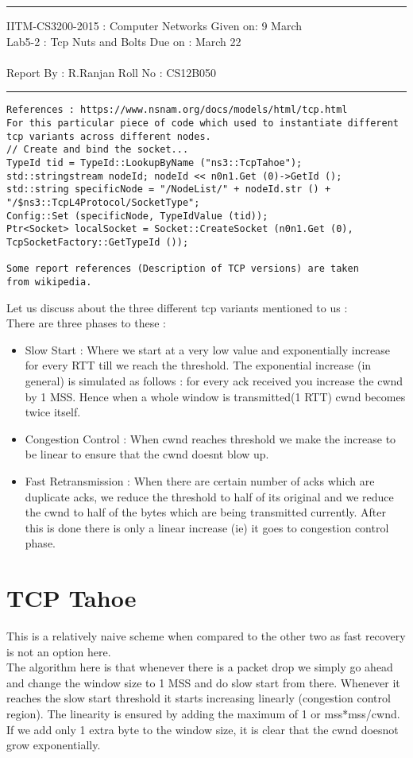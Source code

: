 \documentclass[solution,addpoints,12pt]{exam}
\begin{document}
\hrule
\vspace{3mm}
\noindent
{\sf IITM-CS3200-2015 : Computer Networks  \hfill Given on: 9 March}
\vspace{3mm} \\
\noindent
{\sf Lab5-2 : Tcp Nuts and Bolts \hfill Due on : March 22}\\\\
\vspace{3mm}
\noindent
{\sf Report By : R.Ranjan \hfill Roll No : CS12B050}
\vspace{3mm}
\hrule
\begin{verbatim}
References : https://www.nsnam.org/docs/models/html/tcp.html
For this particular piece of code which used to instantiate different
tcp variants across different nodes.
// Create and bind the socket...
TypeId tid = TypeId::LookupByName ("ns3::TcpTahoe");
std::stringstream nodeId; nodeId << n0n1.Get (0)->GetId ();
std::string specificNode = "/NodeList/" + nodeId.str () + "/$ns3::TcpL4Protocol/SocketType";
Config::Set (specificNode, TypeIdValue (tid));
Ptr<Socket> localSocket = Socket::CreateSocket (n0n1.Get (0), TcpSocketFactory::GetTypeId ());

Some report references (Description of TCP versions) are taken
from wikipedia.
\end{verbatim}


Let us discuss about the three different tcp variants
mentioned to us :\\
There are three phases to these :
\begin{itemize}
\item
Slow Start : Where we start at a very low value and
exponentially increase for every RTT till we reach the threshold.
The exponential increase (in general) is simulated as follows :
for every ack received you increase the cwnd by 1 MSS. Hence when
a whole window is transmitted(1 RTT) cwnd becomes twice itself.\\
\item
Congestion Control : When cwnd reaches threshold we
make the increase to be linear to ensure that the cwnd doesnt
blow up.
\item
Fast Retransmission : When there are certain number of acks
which are duplicate acks, we reduce the threshold to half of its
original and we reduce the cwnd to half of the bytes which
are being transmitted currently. After this is done there is only
a linear increase (ie) it goes to congestion control phase.
\end{itemize}
\section{TCP Tahoe}
This is a relatively naive scheme when compared to the
other two as fast recovery is not an option here.\\
The algorithm here is that whenever there is a packet drop
we simply go ahead and change the window size to 1 MSS
and do slow start from there. Whenever it reaches the slow start threshold
it starts increasing linearly (congestion control region).
The linearity is ensured by adding the maximum of 1 or
mss*mss/cwnd. If we add only 1 extra byte to the window size,
it is clear that the cwnd doesnot grow exponentially.\\
\end{document}
